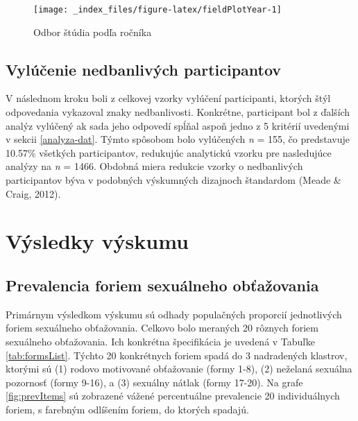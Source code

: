 \documentclass[
]{article}
\begin{document}
\begin{figure}

{\centering \texttt{[image: \_index\_files/figure-latex/fieldPlotYear-1]} 

}

\caption{Odbor štúdia podľa ročníka}\label{fig:fieldPlotYear}
\end{figure}

\hypertarget{vyluxfaux10denie-nedbanlivuxfdch-participantov}{%
\subsection{Vylúčenie nedbanlivých participantov}\label{vyluxfaux10denie-nedbanlivuxfdch-participantov}}

V následnom kroku boli z celkovej vzorky vylúčení participanti, ktorých štýl odpovedania vykazoval znaky nedbanlivosti. Konkrétne, participant bol z ďalších analýz vylúčený ak sada jeho odpovedí spĺňal aspoň jedno z 5 kritérií uvedenými v sekcii \ref{analyza-dat}. Týmto spôsobom bolo vylúčených \emph{n} = 155, čo predstavuje 10.57\% všetkých participantov, redukujúc analytickú vzorku pre nasledujúce analýzy na \emph{n} = 1466. Obdobná miera redukcie vzorky o nedbanlivých participantov býva v podobných výskumných dizajnoch štandardom (Meade \& Craig, 2012).

\newpage

\hypertarget{vysledky}{%
\section{Výsledky výskumu}\label{vysledky}}

\hypertarget{prevalencia-foriem-sexuuxe1lneho-obux165aux17eovania}{%
\subsection{Prevalencia foriem sexuálneho obťažovania}\label{prevalencia-foriem-sexuuxe1lneho-obux165aux17eovania}}

Primárnym výsledkom výskumu sú odhady populačných proporcií jednotlivých foriem sexuálneho obťažovania. Celkovo bolo meraných 20 rôznych foriem sexuálneho obťažovania. Ich konkrétna špecifikácia je uvedená v Tabuľke \ref{tab:formsList}. Týchto 20 konkrétnych foriem spadá do 3 nadradených klastrov, ktorými sú (1) rodovo motivované obťažovanie (formy 1-8), (2) neželaná sexuálna pozornosť (formy 9-16), a (3) sexuálny nátlak (formy 17-20). Na grafe \ref{fig:prevItems} sú zobrazené vážené percentuálne prevalencie 20 individuálnych foriem, s farebným odlíšením foriem, do ktorých spadajú.
\end{document}
